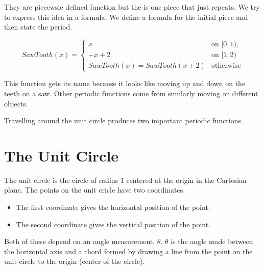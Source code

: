 \documentclass{ximera}
\begin{document}
They are piecewsie defined function but the is one piece that just repeats.  We try to express this idea in a formula. We define a formula for the initial piece and then state the period.




\[
SawTooth(x) = 
\begin{cases}
  x &\text{on $[0,1)$,} \\
  -x+2 &\text{on $[1,2)$} \\ 
  SawTooth(x) = SawTooth(x+2) & \text{otherwise}
\end{cases}
\]

This function gets its name because it looks like moving up and down on the teeth on a saw. Other periodic functions come from similarly moving on different objects. 

Travelling around the unit circle produces two important periodic functions.





















\section{The Unit Circle}


The unit circle is the circle of radius $1$ centered at the origin in the Cartesian plane. The points on the unit cricle have two coordinates.  

\begin{itemize}
\item The first coordinate gives the horizontal position of the point. 
\item The second coordinate gives the vertical position of the point.  
\end{itemize}

Both of these depend on an angle measurement, $\theta$. $\theta$ is the angle made between the horizontal axis and a chord formed by drawing a line from the point on the unit circle to the origin (center of the circle).
\end{document}
